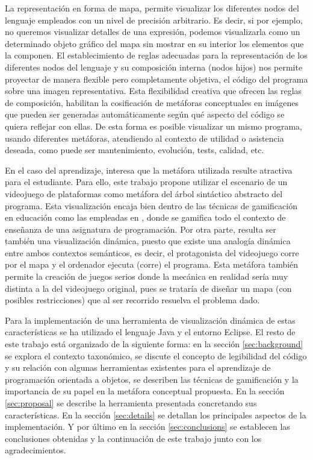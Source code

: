 \documentclass{llncs}
\begin{document}
La representación en forma de mapa, permite visualizar los diferentes nodos del lenguaje empleados con un nivel de precisión arbitrario. Es decir, si por ejemplo, no queremos visualizar detalles de una expresión, podemos visualizarla como un determinado objeto gráfico del mapa sin mostrar en su interior los elementos que la componen. El establecimiento de reglas adecuadas para la representación de los diferentes nodos del lenguaje y su composición interna (nodos hijos) nos permite proyectar de manera flexible pero completamente objetiva, el código del programa sobre una imagen representativa. Esta flexibilidad creativa que ofrecen las reglas de composición, habilitan la cosificación de metáforas conceptuales en imágenes que pueden ser generadas automáticamente según qué aspecto del código se quiera reflejar con ellas. De esta forma es posible visualizar un mismo programa, usando diferentes metáforas, atendiendo al contexto de utilidad o asistencia deseada, como puede ser mantenimiento, evolución, tests, calidad, etc.

En el caso del aprendizaje, interesa que la metáfora utilizada resulte atractiva para el estudiante. Para ello, este trabajo propone utilizar el escenario de un videojuego de plataformas como metáfora del árbol sintáctico abstracto del programa. Esta visualización encaja bien dentro de las técnicas de gamificación en educación como las empleadas en \cite{kumar2012gamification}, donde se gamifica todo el contexto de enseñanza de una asignatura de programación. Por otra parte, resulta ser también una visualización dinámica, puesto que existe una analogía dinámica entre ambos contextos semánticos, es decir, el protagonista del videojuego corre por el mapa y el ordenador ejecuta (corre) el programa. Esta metáfora también permite la creación de juegos serios donde la mecánica en realidad sería muy distinta a la del videojuego original, pues se trataría de diseñar un mapa (con posibles restricciones) que al ser recorrido resuelva el problema dado.

Para la implementación de una herramienta de visualización dinámica de estas características se ha utilizado el lenguaje Java y el entorno Eclipse. El resto de este trabajo está organizado de la siguiente forma: en la sección \ref{sec:background} se explora el contexto taxonómico, se discute el concepto de legibilidad del código y su relación con algunas herramientas existentes para el aprendizaje de programación orientada a objetos, se describen las técnicas de gamificación y la importancia de su papel en la metáfora conceptual propuesta. En la sección \ref{sec:proposal} se describe la herramienta presentada concretando sus características. En la sección \ref{sec:details} se detallan los principales aspectos de la implementación. Y por último en la sección \ref{sec:conclusions} se establecen las conclusiones obtenidas y la continuación de este trabajo junto con los agradecimientos. 
\end{document}
